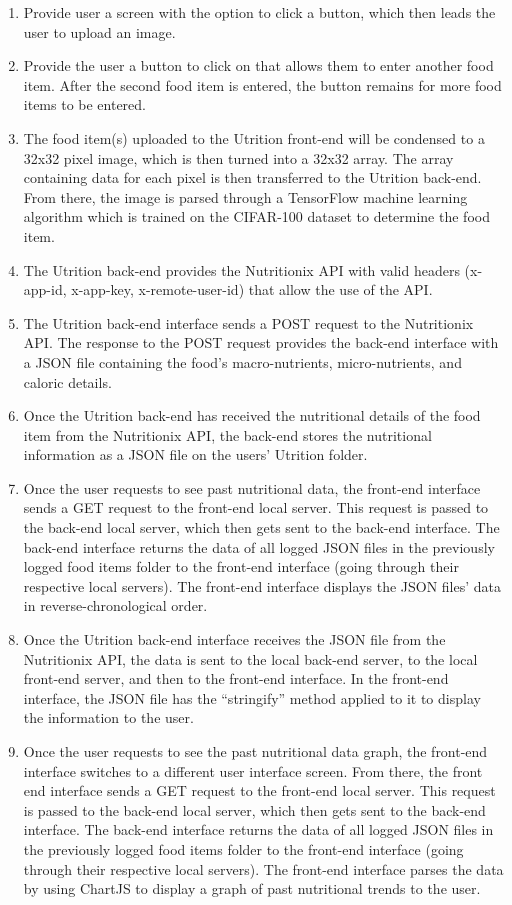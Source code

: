 \documentclass[12pt, titlepage]{article}
\begin{document}
\begin{enumerate}[{FR}1. ]
	\item Provide user a screen with the option to click a button, which then leads the user to upload an image.
	\item Provide the user a button to click on that allows them to enter another food item. After the second food item is entered, the button remains for more food items to be entered.
	\item The food item(s) uploaded to the Utrition front-end will be condensed to a 32x32 pixel image, which is then turned into a 32x32 array. The array containing data for each pixel is then transferred to the Utrition back-end. From there, the image is parsed through a TensorFlow machine learning algorithm which is trained on the CIFAR-100 dataset to determine the food item.
	\item The Utrition back-end provides the Nutritionix API with valid headers (x-app-id, x-app-key, x-remote-user-id) that allow the use of the API.
	\item The Utrition back-end interface sends a POST request to the Nutritionix API. The response to the POST request provides the back-end interface with a JSON file containing the food’s macro-nutrients, micro-nutrients, and caloric details.
	\item Once the Utrition back-end has received the nutritional details of the food item from the Nutritionix API, the back-end stores the nutritional information as a JSON file on the users’ Utrition folder.
	\item Once the user requests to see past nutritional data, the front-end interface sends a GET request to the front-end local server. This request is passed to the back-end local server, which then gets sent to the back-end interface. The back-end interface returns the data of all logged JSON files in the previously logged food items folder to the front-end interface (going through their respective local servers). The front-end interface displays the JSON files’ data in reverse-chronological order.
	\item Once the Utrition back-end interface receives the JSON file from the Nutritionix API, the data is sent to the local back-end server, to the local front-end server, and then to the front-end interface. In the front-end interface, the JSON file has the “stringify” method applied to it to display the information to the user.
	\item Once the user requests to see the past nutritional data graph, the front-end interface switches to a different user interface screen. From there, the front end interface sends a GET request to the front-end local server. This request is passed to the back-end local server, which then gets sent to the back-end interface. The back-end interface returns the data of all logged JSON files in the previously logged food items folder to the front-end interface (going through their respective local servers). The front-end interface parses the data by using ChartJS to display a graph of past nutritional trends to the user.
\end{enumerate}
\end{document}
